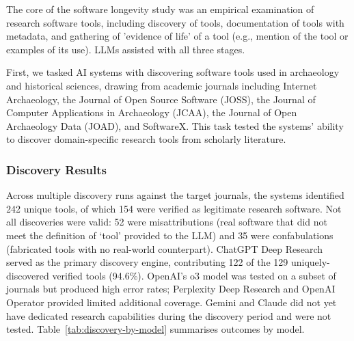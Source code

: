 The core of the software longevity study was an empirical examination of research software tools, including discovery of tools, documentation of tools with metadata, and gathering of 'evidence of life' of a tool (e.g., mention of the tool or examples of its use). LLMs assisted with all three stages. 

First, we tasked AI systems with discovering software tools used in archaeology and historical sciences, drawing from academic journals including Internet Archaeology, the Journal of Open Source Software (JOSS), the Journal of Computer Applications in Archaeology (JCAA), the Journal of Open Archaeology Data (JOAD), and SoftwareX. This task tested the systems' ability to discover domain-specific research tools from scholarly literature.

\subsubsection{Discovery Results}

Across multiple discovery runs against the target journals, the systems identified 242 unique tools, of which 154 were verified as legitimate research software. Not all discoveries were valid: 52 were misattributions (real software that did not meet the definition of `tool' provided to the LLM) and 35 were confabulations (fabricated tools with no real-world counterpart). ChatGPT Deep Research served as the primary discovery engine, contributing 122 of the 129 uniquely-discovered verified tools (94.6\%). OpenAI's o3 model was tested on a subset of journals but produced high error rates; Perplexity Deep Research and OpenAI Operator provided limited additional coverage. Gemini and Claude did not yet have dedicated research capabilities during the discovery period and were not tested. Table~\ref{tab:discovery-by-model} summarises outcomes by model.

